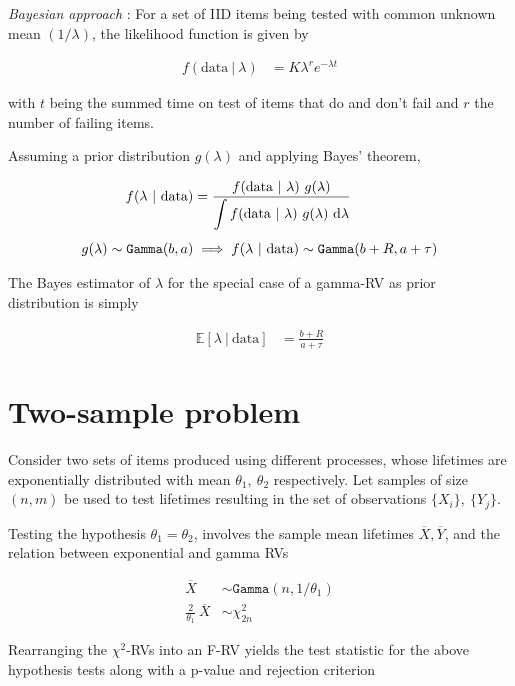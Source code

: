 \textit{Bayesian approach} : For a set of IID items being tested with common unknown mean \((1/\lambda)\), the likelihood function is given by

\begin{align}
	f(\text{data}\ |\ \lambda) &= K \lambda^r e^{-\lambda t}
\end{align}

with \(t\) being the summed time on test of items that do and don't fail and \(r\) the number of failing items.

Assuming a prior distribution \(g(\lambda)\) and applying Bayes' theorem,

\begin{align}
	f(\lambda\ |\ \text{data}) &= \frac{\displaystyle f(\text{data}\ |\ \lambda) \ g(\lambda)}{\displaystyle \int f(\text{data}\ |\ \lambda) \ g(\lambda)\ \mathrm{d} \lambda} \\[1ex]
	g(\lambda) \sim \texttt{Gamma}(b, a) &\implies f(\lambda\ |\ \text{data}) \sim \texttt{Gamma}(b + R, a + \tau)
\end{align}

The Bayes estimator of \(\lambda\) for the special case of a gamma-RV as prior distribution is simply

\begin{align}
	\mathbb{E}[\lambda\ |\ \text{data}] &= \frac{b+R}{a+\tau}
\end{align}

\section{Two-sample problem}

Consider two sets of items produced using different processes, whose lifetimes are exponentially distributed with mean \(\theta_1,\ \theta_2\) respectively. Let samples of size \((n, m)\) be used to test lifetimes resulting in the set of observations \( \{X_i\},\ \{Y_j\} \).

Testing the hypothesis \(\theta_1 = \theta_2\), involves the sample mean lifetimes \(\overline{X}, \overline{Y}\), and the relation between exponential and gamma RVs

\begin{align}
	\overline{X} &\sim \texttt{Gamma}(n, 1/\theta_1) \nonumber \\
	\frac{2}{\theta_1}\ \overline{X} &\sim \chi^2_{2n}
\end{align}

Rearranging the \(\chi^2\)-RVs into an F-RV yields the test statistic for the above hypothesis tests along with a p-value and rejection criterion

